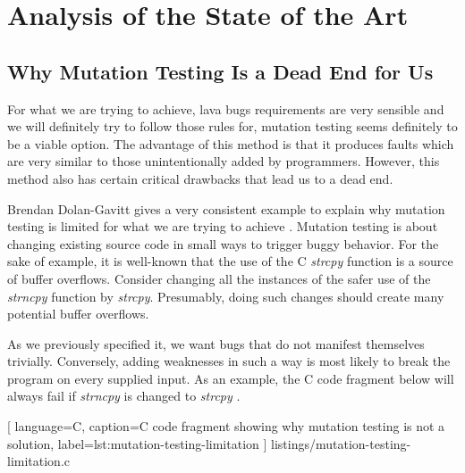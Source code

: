 \vspace{-0.5cm}

\section{Analysis of the State of the Art}

\vspace{-0.3cm}

\subsection{Why Mutation Testing Is a Dead End for Us}

\vspace{-0.2cm}

For what we are trying to achieve, \gls{lava} bugs requirements are very sensible and we will definitely try to follow those rules for, mutation testing seems definitely to be a viable option. The advantage of this method is that it produces faults which are very similar to those unintentionally added by programmers. However, this method also has certain critical drawbacks that lead us to a dead end.

Brendan Dolan-Gavitt gives a very consistent example to explain why mutation testing is limited for what we are trying to achieve \cite{dolan2016mechanics}. Mutation testing is about changing existing source code in small ways to trigger buggy behavior. For the sake of example, it is well-known that the use of the C \emph{strcpy} function is a source of buffer overflows. Consider changing all the instances of the safer use of the \emph{strncpy} function by \emph{strcpy}. Presumably, doing such changes should create many potential buffer overflows.

As we previously specified it, we want bugs that do not manifest themselves trivially. Conversely, adding weaknesses in such a way is most likely to break the program on every supplied input. As an example, the C code fragment below will always fail if \emph{strncpy} is changed to \emph{strcpy} \cite{dolan2016mechanics}.

\vspace{0.5cm}


    [
        language=C,
        caption=C code fragment showing why mutation testing is not a solution,
        label=lst:mutation-testing-limitation
    ]
    {listings/mutation-testing-limitation.c}
    
\vspace{-0.2cm}

